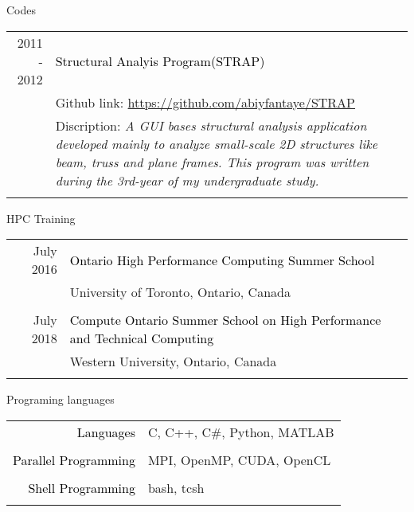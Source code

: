 \documentclass{resume} %
\begin{document}
\begin{rSection}{Codes}
\begin{tabular}{r|p{14cm}}
  \footnotesize{2011 - 2012} & \textcolor{black} {Structural Analyis Program(STRAP)}\\& \footnotesize {Github link}: \url{https://github.com/abiyfantaye/STRAP} \\& \footnotesize{Discription}: \emph{A GUI bases structural analysis application developed mainly to analyze small-scale 2D structures like beam, truss and plane frames. This program was written during the 3rd-year of my undergraduate study.} \\ \\
  
  \end{tabular}
\end{rSection}


\begin{rSection}{HPC Training}
  \begin{tabular}{r|p{14cm}}
    \footnotesize{July 2016} & \textcolor{black}{Ontario High Performance Computing Summer School} \\& \footnotesize{University of Toronto, Ontario, Canada} \\& \\
    \footnotesize{July 2018} & \textcolor{black}{Compute Ontario Summer School on High Performance and Technical Computing } \\& \footnotesize{Western University, Ontario, Canada} \\& \\
  \end{tabular}
\end{rSection}


\begin{rSection}{Programing languages}
  \begin{tabular}{r|p{14cm}}
    \textcolor{black}{Languages} & \footnotesize{C, C++, C\#, Python, MATLAB} \\& \\
    \textcolor{black}{Parallel Programming} & \footnotesize{MPI, OpenMP, CUDA, OpenCL} \\& \\
    \textcolor{black}{Shell Programming} & \footnotesize{bash, tcsh} \\& \\
  \end{tabular}
\end{rSection}
\end{document}
